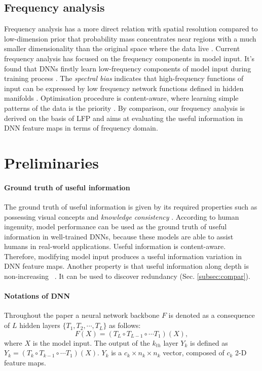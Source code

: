\documentclass{article}
\begin{document}
\subsection{Frequency analysis} 
Frequency analysis has a more direct relation with spatial resolution compared to low-dimension prior that probability mass concentrates near regions with a much smaller dimensionality than the original space where the data live \cite{Representation_Learning}. Current frequency analysis has focused on the frequency components in model input. It's found that DNNs firstly learn low-frequency components of model input during training process \cite{freq_principle,training_behavior}. The \textit{spectral bias} indicates that high-frequency functions of input can be expressed by low frequency network functions defined in hidden manifolds \cite{on_the_spectral_bias}. Optimisation procedure is content-aware, where learning simple patterns of the data is the priority \cite{Arpit2017ACL}. By comparison, our frequency analysis is derived on the basis of LFP and aims at evaluating the useful information in DNN feature maps in terms of frequency domain.

\section{Preliminaries}
\paragraph{Ground truth of useful information}\label{sec:truth_ui} The ground truth of useful information is given by its required properties such as possessing visual concepts and \textit{knowledge consistency} \cite{knowledge_consistency_2,knowledge_consistency_1}. According to human ingenuity, model performance can be used as the ground truth of useful information in well-trained DNNs, because these models are able to assist humans in real-world applications. Useful information is content-aware. Therefore, modifying model input produces a useful information variation in DNN feature maps. Another property is that useful information along depth is non-increasing ~\cite{Opening_the_Black_Box_of_Deep_Neural_Networks_via_Information}. It can be used to discover redundancy (Sec. \ref{subsec:compar}). 
\paragraph{Notations of DNN} Throughout the paper a neural network backbone $F$ is denoted as a consequence of $L$ hidden layers $\{T_1, T_2, \cdots, T_L\}$ as follows: 
\begin{equation}
F(X)=(T_L\circ T_{L-1}\circ \cdots T_1)(X),   
\end{equation}
where $X$ is the model input. The output of the $k_{th}$ layer $Y_k$ is defined as $Y_k=(T_k\circ T_{k-1}\circ \cdots T_1)(X)$. $Y_k$ is a $\mathit{c}_k \times \mathit{n}_k\times \mathit{n}_k$ vector, composed of $\mathit{c}_k$ 2-D feature maps.
\end{document}
